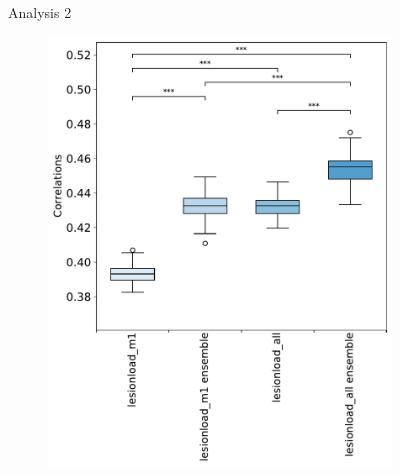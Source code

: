 \documentclass[10pt]{article}
\begin{document}
\begin{figure}
\begin{subfigure}{0.5\textwidth}
  \caption{}
  \label{fig:sfig1}
\end{subfigure}
\caption{Analysis 2}
\label{fig:fig}
\end{figure}

\begin{figure}
\begin{subfigure}{0.5\textwidth}
  \centering
  \includegraphics[width=1\linewidth]{figures/analysis_5_boxplots_correlations.pdf}
  \caption{}
  \label{fig:sfig1}
\end{subfigure}
\begin{subfigure}{0.5\textwidth}
  \centering

\end{subfigure}
\end{figure}
\end{document}
